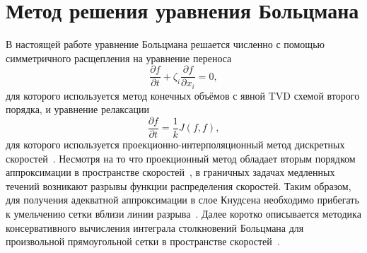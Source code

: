 \documentclass[10pt]{article}
\newcommand{\pder}[2][]{\frac{\partial#1}{\partial#2}}
\begin{document}
\section{Метод решения уравнения Больцмана}

В настоящей работе уравнение Больцмана решается численно с помощью
симметричного расщепления на уравнение переноса
\begin{equation}\label{eq:split_advection}
    \pder[f]{t} + \zeta_i\pder[f]{x_i} = 0,
\end{equation}
для которого используется метод конечных объёмов с явной TVD схемой второго порядка,
и уравнение релаксации
\begin{equation}\label{eq:split_integral}
    \pder[f]{t} = \frac1k J(f,f),
\end{equation}
для которого используется проекционно-интерполяционный метод дискретных скоростей~\cite{Tcheremissine1997, Tcheremissine2006}.
Несмотря на то что проекционный метод обладает вторым порядком аппроксимации в пространстве скоростей~\cite{Anikin2012},
в граничных задачах медленных течений возникают разрывы функции распределения скоростей.
Таким образом, для получения адекватной аппроксимации в слое Кнудсена необходимо прибегать
к умельчению сетки вблизи линии разрыва~\cite{Rogozin2015}.
Далее коротко описывается методика консервативного вычисления интеграла столкновений Больцмана
для произвольной прямоугольной сетки в пространстве скоростей~\cite{Dodulad2015}.
\end{document}

